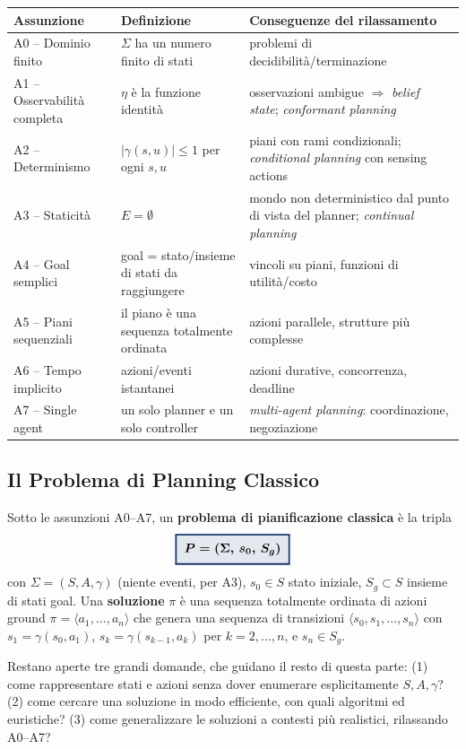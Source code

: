\documentclass[a4paper,11pt]{article}
\newcommand{\keyeq}[1]{{\setlength{\fboxsep}{6pt}\setlength{\fboxrule}{1.3pt}\fcolorbox{iablue}{iablue!12}{\boldmath$\displaystyle #1$}}}
\begin{document}
\begin{center}
\small
\begin{tabular}{p{2.7cm}p{5.3cm}p{6.8cm}}
\toprule
\textbf{Assunzione} & \textbf{Definizione} & \textbf{Conseguenze del rilassamento} \\
\midrule
A0 -- Dominio finito & $\Sigma$ ha un numero finito di stati & problemi di decidibilità/terminazione \\
A1 -- Osservabilità completa & $\eta$ è la funzione identità & osservazioni ambigue $\Rightarrow$ \emph{belief state}; \emph{conformant planning} \\
A2 -- Determinismo & $|\gamma(s,u)|\leq1$ per ogni $s,u$ & piani con rami condizionali; \emph{conditional planning} con sensing actions \\
A3 -- Staticità & $E=\emptyset$ & mondo non deterministico dal punto di vista del planner; \emph{continual planning} \\
A4 -- Goal semplici & goal = stato/insieme di stati da raggiungere & vincoli su piani, funzioni di utilità/costo \\
A5 -- Piani sequenziali & il piano è una sequenza totalmente ordinata & azioni parallele, strutture più complesse \\
A6 -- Tempo implicito & azioni/eventi istantanei & azioni durative, concorrenza, deadline \\
A7 -- Single agent & un solo planner e un solo controller & \emph{multi-agent planning}: coordinazione, negoziazione \\
\bottomrule
\end{tabular}
\end{center}

\subsection{Il Problema di Planning Classico}

Sotto le assunzioni A0--A7, un \textbf{problema di pianificazione classica} è la tripla
\[
\keyeq{P = (\Sigma,\,s_0,\,S_g)}
\]
con $\Sigma=(S,A,\gamma)$ (niente eventi, per A3), $s_0\in S$ stato iniziale, $S_g\subset S$ insieme di stati goal. Una \textbf{soluzione} $\pi$ è una sequenza totalmente ordinata di azioni ground $\pi=\langle a_1,\ldots,a_n\rangle$ che genera una sequenza di transizioni $\langle s_0,s_1,\ldots,s_n\rangle$ con $s_1=\gamma(s_0,a_1)$, $s_k=\gamma(s_{k-1},a_k)$ per $k=2,\ldots,n$, e $s_n\in S_g$.

Restano aperte tre grandi domande, che guidano il resto di questa parte: (1) come rappresentare stati e azioni senza dover enumerare esplicitamente $S,A,\gamma$? (2) come cercare una soluzione in modo efficiente, con quali algoritmi ed euristiche? (3) come generalizzare le soluzioni a contesti più realistici, rilassando A0--A7?
\end{document}
